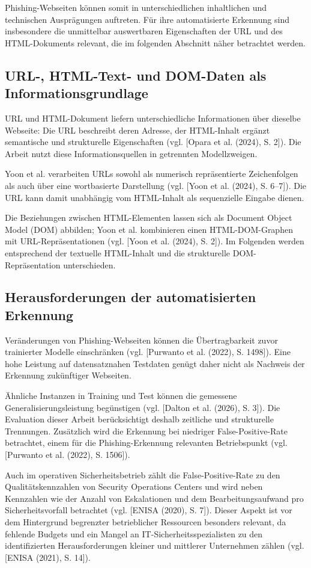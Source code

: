 Phishing-Webseiten können somit in unterschiedlichen inhaltlichen und technischen Ausprägungen auftreten. Für ihre automatisierte Erkennung sind insbesondere die unmittelbar auswertbaren Eigenschaften der URL und des HTML-Dokuments relevant, die im folgenden Abschnitt näher betrachtet werden.

\subsection{URL-, HTML-Text- und DOM-Daten als Informationsgrundlage}
URL und HTML-Dokument liefern unterschiedliche Informationen über dieselbe Webseite: Die URL beschreibt deren Adresse, der HTML-Inhalt ergänzt semantische und strukturelle Eigenschaften (vgl. [Opara et al. (2024), S. 2]). Die Arbeit nutzt diese Informationsquellen in getrennten Modellzweigen.

Yoon et al. verarbeiten URLs sowohl als numerisch repräsentierte Zeichenfolgen als auch über eine wortbasierte Darstellung (vgl. [Yoon et al. (2024), S. 6--7]). Die URL kann damit unabhängig vom HTML-Inhalt als sequenzielle Eingabe dienen.

Die Beziehungen zwischen HTML-Elementen lassen sich als Document Object Model (DOM) abbilden; Yoon et al. kombinieren einen HTML-DOM-Graphen mit URL-Repräsentationen (vgl. [Yoon et al. (2024), S. 2]). Im Folgenden werden entsprechend der textuelle HTML-Inhalt und die strukturelle DOM-Repräsentation unterschieden.

\subsection{Herausforderungen der automatisierten Erkennung}

Veränderungen von Phishing-Webseiten können die Übertragbarkeit zuvor trainierter Modelle einschränken (vgl. [Purwanto et al. (2022), S. 1498]). Eine hohe Leistung auf datensatznahen Testdaten genügt daher nicht als Nachweis der Erkennung zukünftiger Webseiten.

Ähnliche Instanzen in Training und Test können die gemessene Generalisierungsleistung begünstigen (vgl. [Dalton et al. (2026), S. 3]). Die Evaluation dieser Arbeit berücksichtigt deshalb zeitliche und strukturelle Trennungen. Zusätzlich wird die Erkennung bei niedriger False-Positive-Rate betrachtet, einem für die Phishing-Erkennung relevanten Betriebspunkt (vgl. [Purwanto et al. (2022), S. 1506]).

Auch im operativen Sicherheitsbetrieb zählt die False-Positive-Rate zu den Qualitätskennzahlen
von Security Operations Centers und wird neben Kennzahlen wie der Anzahl von Eskalationen und
dem Bearbeitungsaufwand pro Sicherheitsvorfall betrachtet
(vgl. [ENISA (2020), S. 7]). Dieser Aspekt ist vor dem Hintergrund begrenzter betrieblicher
Ressourcen besonders relevant, da fehlende Budgets und ein Mangel an
IT-Sicherheitsspezialisten zu den identifizierten Herausforderungen kleiner und mittlerer
Unternehmen zählen (vgl. [ENISA (2021), S. 14]).


